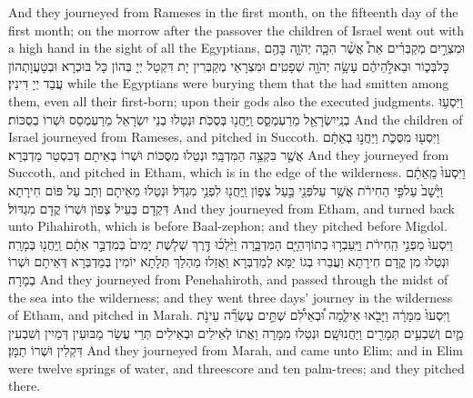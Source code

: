 {And they journeyed from Rameses in the first month, on the fifteenth day of the first month; on the morrow after the passover the children of Israel went out with a high hand in the sight of all the Egyptians,}{}
{וּמִצְרַ֣יִם מְקַבְּרִ֗ים אֵת֩ אֲשֶׁ֨ר הִכָּ֧ה יְהֹוָ֛ה בָּהֶ֖ם כׇּל\maqqaf בְּכ֑וֹר וּבֵאלֹ֣הֵיהֶ֔ם עָשָׂ֥ה יְהֹוָ֖ה שְׁפָטִֽים׃}
{וּמִצְרָאֵי מְקַבְּרִין יָת דִּקְטַל יְיָ בְּהוֹן כָּל בּוּכְרָא וּבְטָעֲוָתְהוֹן עֲבַד יְיָ דִּינִין׃}
{while the Egyptians were burying them that the \lord\space had smitten among them, even all their first-born; upon their gods also the \lord\space executed judgments.}{}
{וַיִּסְע֥וּ בְנֵֽי\maqqaf יִשְׂרָאֵ֖ל מֵרַעְמְסֵ֑ס וַֽיַּחֲנ֖וּ בְּסֻכֹּֽת׃}
{וּנְטַלוּ בְנֵי יִשְׂרָאֵל מֵרַעְמְסֵס וּשְׁרוֹ בְסֻכּוֹת׃}
{And the children of Israel journeyed from Rameses, and pitched in Succoth.}{}
{וַיִּסְע֖וּ מִסֻּכֹּ֑ת וַיַּחֲנ֣וּ בְאֵתָ֔ם אֲשֶׁ֖ר בִּקְצֵ֥ה הַמִּדְבָּֽר׃}
{וּנְטַלוּ מִסֻּכּוֹת וּשְׁרוֹ בְּאֵיתָם דְּבִסְטַר מַדְבְּרָא׃}
{And they journeyed from Succoth, and pitched in Etham, which is in the edge of the wilderness.}{}
{וַיִּסְעוּ֙ מֵֽאֵתָ֔ם וַיָּ֙שׇׁב֙ עַל\maqqaf פִּ֣י הַחִירֹ֔ת אֲשֶׁ֥ר עַל\maqqaf פְּנֵ֖י בַּ֣עַל צְפ֑וֹן וַֽיַּחֲנ֖וּ לִפְנֵ֥י מִגְדֹּֽל׃}
{וּנְטַלוּ מֵאֵיתָם וְתָב עַל פּוֹם חִירָתָא דִּקְדָם בְּעֵיל צְפוֹן וּשְׁרוֹ קֳדָם מִגְדּוֹל׃}
{And they journeyed from Etham, and turned back unto Pihahiroth, which is before Baal-zephon; and they pitched before Migdol.}{}
{וַיִּסְעוּ֙ מִפְּנֵ֣י הַֽחִירֹ֔ת וַיַּֽעַבְר֥וּ בְתוֹךְ\maqqaf הַיָּ֖ם הַמִּדְבָּ֑רָה וַיֵּ֨לְכ֜וּ דֶּ֣רֶךְ שְׁלֹ֤שֶׁת יָמִים֙ בְּמִדְבַּ֣ר אֵתָ֔ם וַֽיַּחֲנ֖וּ בְּמָרָֽה׃}
{וּנְטַלוּ מִן קֳדָם חִירָתָא וַעֲבַרוּ בְגוֹ יַמָּא לְמַדְבְּרָא וַאֲזַלוּ מַהְלַךְ תְּלָתָא יוֹמִין ‏‏בְּמַדְבְּרָא דְּאֵיתָם וּשְׁרוֹ בְמָרָה׃}
{And they journeyed from Penehahiroth, and passed through the midst of the sea into the wilderness; and they went three days’ journey in the wilderness of Etham, and pitched in Marah.}{}
{וַיִּסְעוּ֙ מִמָּרָ֔ה וַיָּבֹ֖אוּ אֵילִ֑מָה וּ֠בְאֵילִ֠ם שְׁתֵּ֣ים עֶשְׂרֵ֞ה עֵינֹ֥ת מַ֛יִם וְשִׁבְעִ֥ים תְּמָרִ֖ים וַיַּחֲנוּ\maqqaf שָֽׁם׃}
{וּנְטַלוּ מִמָּרָה וַאֲתוֹ לְאֵילִים וּבְאֵילִים תְּרֵי עֲשַׂר מַבּוּעִין דְּמַיִין וְשִׁבְעִין דִּקְלִין וּשְׁרוֹ תַמָּן׃}
{And they journeyed from Marah, and came unto Elim; and in Elim were twelve springs of water, and threescore and ten palm-trees; and they pitched there.}{}
